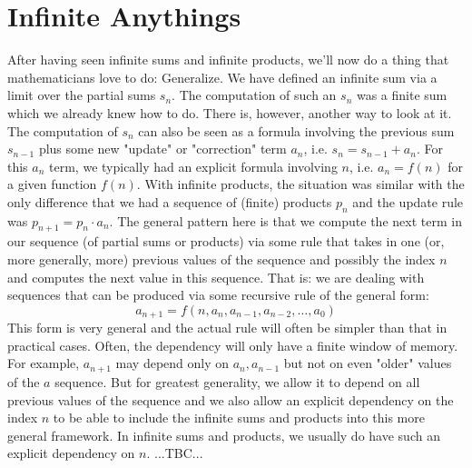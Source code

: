 \section{Infinite Anythings}
After having seen infinite sums and infinite products, we'll now do a thing that mathematicians love to do: Generalize. We have defined an infinite sum via a limit over the partial sums $s_n$. The computation of such an $s_n$ was a finite sum which we already knew how to do. There is, however, another way to look at it. The computation of $s_n$ can also be seen as a formula involving the previous sum $s_{n-1}$ plus some new "update" or "correction" term $a_n$, i.e. $s_n = s_{n-1} + a_n$. For this $a_n$ term, we typically had an explicit formula involving $n$, i.e. $a_n = f(n)$ for a given function $f(n)$. With infinite products, the situation was similar with the only difference that we had a sequence of (finite) products $p_n$ and the update rule was $p_{n+1} = p_n \cdot a_n$. The general pattern here is that we compute the next term in our sequence (of partial sums or products) via some rule that takes in one (or, more generally, more) previous values of the sequence and possibly the index $n$ and computes the next value in this sequence. That is: we are dealing with sequences that can be produced via some recursive rule of the general form:
\begin{equation}
a_{n+1} = f(n, a_n, a_{n-1}, a_{n-2}, \ldots, a_0)
\end{equation}
This form is very general and the actual rule will often be simpler than that in practical cases. Often, the dependency will only have a finite window of memory. For example, $a_{n+1}$ may depend only on $a_n, a_{n-1}$ but not on even "older" values of the $a$ sequence. But for greatest generality, we allow it to depend on all previous values of the sequence and we also allow an explicit dependency on the index $n$ to be able to include the infinite sums and products into this more general framework. In infinite sums and products, we usually do have such an explicit dependency on $n$. ...TBC...

%
%
%


